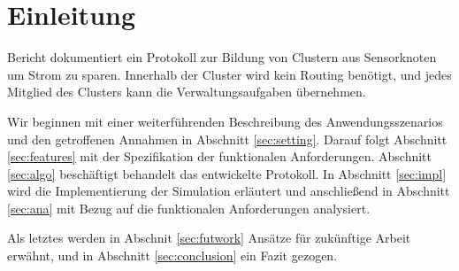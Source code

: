 \section{Einleitung} \label{sec:intro}
 Bericht dokumentiert ein Protokoll zur Bildung von Clustern aus Sensorknoten um Strom zu sparen. Innerhalb der Cluster wird kein Routing ben\"otigt, und jedes Mitglied des Clusters kann die Verwaltungsaufgaben \"ubernehmen.

Wir beginnen mit einer weiterf\"uhrenden Beschreibung des Anwendungsszenarios und den getroffenen Annahmen in Abschnitt \ref{sec:setting}.
Darauf folgt Abschnitt \ref{sec:features} mit der Spezifikation der funktionalen Anforderungen.
Abschnitt \ref{sec:algo} besch\"aftigt behandelt das entwickelte Protokoll.
In Abschnitt \ref{sec:impl} wird die Implementierung der Simulation erläutert und anschließend in Abschnitt \ref{sec:ana} mit Bezug auf die funktionalen Anforderungen analysiert.


Als letztes werden in Abschnit \ref{sec:futwork} Ans\"atze f\"ur zuk\"unftige Arbeit erw\"ahnt, und in Abschnitt \ref{sec:conclusion} ein Fazit gezogen.
